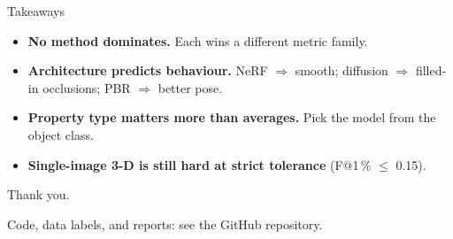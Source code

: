 \documentclass[aspectratio=169, 11pt]{beamer}
\begin{document}
\begin{frame}{Takeaways}

  \begin{itemize}
    \item \textbf{No method dominates.} Each wins a different metric family.
    \item \textbf{Architecture predicts behaviour.} NeRF $\Rightarrow$ smooth; diffusion $\Rightarrow$ filled-in occlusions; PBR $\Rightarrow$ better pose.
    \item \textbf{Property type matters more than averages.} Pick the model from the object class.
    \item \textbf{Single-image 3-D is still hard at strict tolerance} (F@1\,\% $\leq$ 0.15).
  \end{itemize}

  \vspace{1.2em}
  \begin{center}
    \large Thank you.\par\vspace{2pt}
    \scriptsize Code, data labels, and reports: see the GitHub repository.
  \end{center}
\end{frame}
\end{document}
